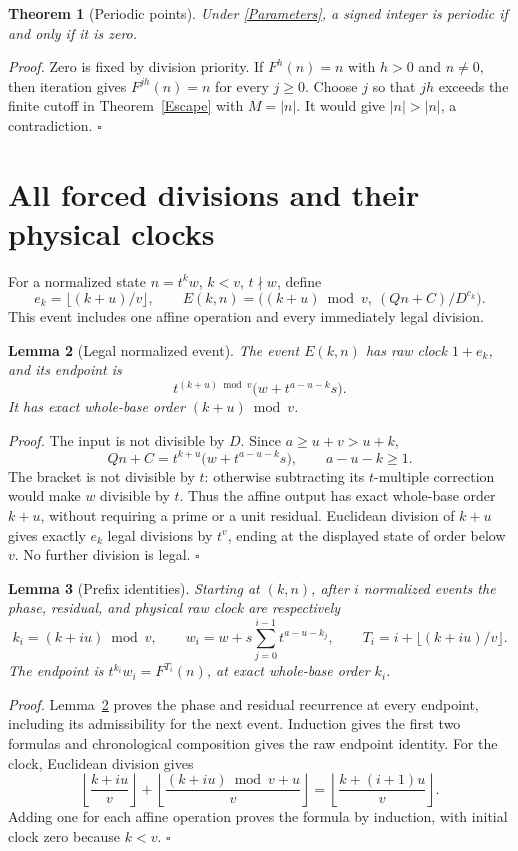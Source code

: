 \documentclass[11pt,letterpaper]{article}
\newtheorem{theorem}{Theorem}
\newtheorem{lemma}[theorem]{Lemma}
\newenvironment{proof}{\noindent\textit{Proof.}}{\hfill\(\square\)}
\begin{document}
\begin{theorem}[Periodic points]\label{Periodic}
Under \eqref{Parameters}, a signed integer is periodic if and only if it is zero.
\end{theorem}
\begin{proof}
Zero is fixed by division priority. If \(F^h(n)=n\) with \(h>0\) and \(n\ne0\),
then iteration gives \(F^{jh}(n)=n\) for every \(j\ge0\).
Choose \(j\) so that \(jh\) exceeds the finite cutoff in
Theorem~\ref{Escape} with \(M=|n|\). It would give \(|n|>|n|\), a contradiction.
\end{proof}

\section{All forced divisions and their physical clocks}

For a normalized state \(n=t^k w\), \(k<v\), \(t\nmid w\), define
\[
e_k=\lfloor(k+u)/v\rfloor,\qquad
E(k,n)=\bigl((k+u)\bmod v,\ (Qn+C)/D^{e_k}\bigr).
\]
This event includes one affine operation and every immediately legal division.

\begin{lemma}[Legal normalized event]\label{Event}
The event \(E(k,n)\) has raw clock \(1+e_k\), and its endpoint is
\[
t^{(k+u)\bmod v}\bigl(w+t^{a-u-k}s\bigr).
\]
It has exact whole-base order \((k+u)\bmod v\).
\end{lemma}
\begin{proof}
The input is not divisible by \(D\). Since \(a\ge u+v>u+k\),
\[
Qn+C=t^{k+u}\bigl(w+t^{a-u-k}s\bigr),
\qquad a-u-k\ge1.
\]
The bracket is not divisible by \(t\): otherwise subtracting its
\(t\)-multiple correction would make \(w\) divisible by \(t\).
Thus the affine output has exact whole-base order \(k+u\), without
requiring a prime or a unit residual. Euclidean division of \(k+u\)
gives exactly \(e_k\) legal divisions by \(t^v\), ending at the displayed
state of order below \(v\). No further division is legal.
\end{proof}

\begin{lemma}[Prefix identities]\label{Prefix}
Starting at \((k,n)\), after \(i\) normalized events the phase, residual,
and physical raw clock are respectively
\[
k_i=(k+iu)\bmod v,\qquad
w_i=w+s\sum_{j=0}^{i-1}t^{a-u-k_j},\qquad
T_i=i+\lfloor(k+iu)/v\rfloor.
\]
The endpoint is \(t^{k_i}w_i=F^{T_i}(n)\), at exact whole-base order \(k_i\).
\end{lemma}
\begin{proof}
Lemma~\ref{Event} proves the phase and residual recurrence at every endpoint,
including its admissibility for the next event. Induction gives the first
two formulas and chronological composition gives the raw endpoint identity.
For the clock, Euclidean division gives
\[
\left\lfloor\frac{k+iu}{v}\right\rfloor+
\left\lfloor\frac{(k+iu)\bmod v+u}{v}\right\rfloor
=\left\lfloor\frac{k+(i+1)u}{v}\right\rfloor .
\]
Adding one for each affine operation proves the formula by induction,
with initial clock zero because \(k<v\).
\end{proof}
\end{document}
